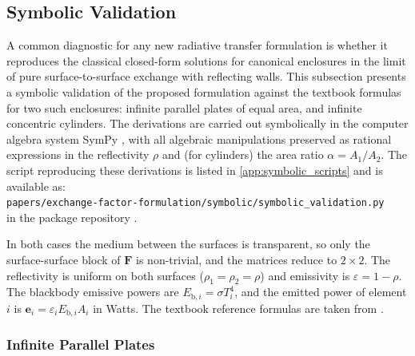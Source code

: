 \documentclass[preprint,1p,times]{elsarticle}
\theoremstyle{plain}
\theoremstyle{definition}
\theoremstyle{remark}
\begin{document}
\subsection{Symbolic Validation}
\label{sec:symbolic_validation}

A common diagnostic for any new radiative transfer formulation is whether it reproduces the classical closed-form solutions for canonical enclosures in the limit of pure surface-to-surface exchange with reflecting walls. This subsection presents a symbolic validation of the proposed formulation against the textbook formulas for two such enclosures: infinite parallel plates of equal area, and infinite concentric cylinders. The derivations are carried out symbolically in the computer algebra system SymPy \citep{SymPy2017}, with all algebraic manipulations preserved as rational expressions in the reflectivity $\rho$ and (for cylinders) the area ratio $\alpha = A_1/A_2$. The script reproducing these derivations is listed in \ref{app:symbolic_scripts} and is available as:\\ \texttt{papers/exchange-factor-formulation/symbolic/symbolic\_validation.py}\\ in the package repository \citep{Bielefeld2024}.

In both cases the medium between the surfaces is transparent, so only the surface-surface block of $\mathbf{F}$ is non-trivial, and the matrices reduce to $2 \times 2$. The reflectivity is uniform on both surfaces ($\rho_1 = \rho_2 = \rho$) and emissivity is $\varepsilon = 1 - \rho$. The blackbody emissive powers are $E_{\mathrm{b},i} = \sigma T_i^4$, and the emitted power of element $i$ is $\mathbf{e}_i = \varepsilon_i E_{\mathrm{b},i} A_i$ in Watts. The textbook reference formulas are taken from \citep{Daun2021}.

\subsubsection{Infinite Parallel Plates}
\label{sec:symbolic_plates}
\end{document}
